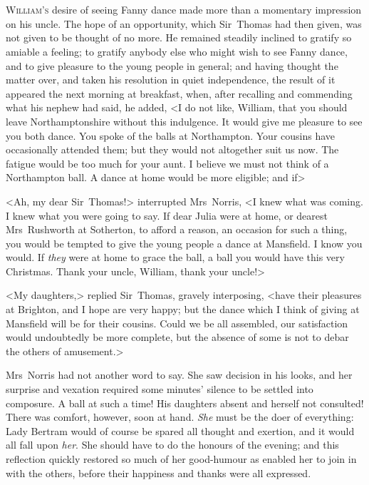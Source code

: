 \chapter[Chapter \thechapter]{} 

 \lettrine[lraise=0.3]{W}{illiam's} desire of seeing Fanny dance made more than a momentary impression on his uncle. The hope of an opportunity, which Sir~Thomas had then given, was not given to be thought of no more. He remained steadily inclined to gratify so amiable a feeling; to gratify anybody else who might wish to see Fanny dance, and to give pleasure to the young people in general; and having thought the matter over, and taken his resolution in quiet independence, the result of it appeared the next morning at breakfast, when, after recalling and commending what his nephew had said, he added, <I do not like, William, that you should leave Northamptonshire without this indulgence. It would give me pleasure to see you both dance. You spoke of the balls at Northampton. Your cousins have occasionally attended them; but they would not altogether suit us now. The fatigue would be too much for your aunt. I believe we must not think of a Northampton ball. A dance at home would be more eligible; and if\longdash>

<Ah, my dear Sir~Thomas!> interrupted Mrs~Norris, <I knew what was coming. I knew what you were going to say. If dear Julia were at home, or dearest Mrs~Rushworth at Sotherton, to afford a reason, an occasion for such a thing, you would be tempted to give the young people a dance at Mansfield. I know you would. If \textit{they}  were at home to grace the ball, a ball you would have this very Christmas. Thank your uncle, William, thank your uncle!>

<My daughters,> replied Sir~Thomas, gravely interposing, <have their pleasures at Brighton, and I hope are very happy; but the dance which I think of giving at Mansfield will be for their cousins. Could we be all assembled, our satisfaction would undoubtedly be more complete, but the absence of some is not to debar the others of amusement.>

Mrs~Norris had not another word to say. She saw decision in his looks, and her surprise and vexation required some minutes' silence to be settled into composure. A ball at such a time! His daughters absent and herself not consulted! There was comfort, however, soon at hand. \textit{She}  must be the doer of everything: Lady Bertram would of course be spared all thought and exertion, and it would all fall upon \textit{her}. She should have to do the honours of the evening; and this reflection quickly restored so much of her good-humour as enabled her to join in with the others, before their happiness and thanks were all expressed.

